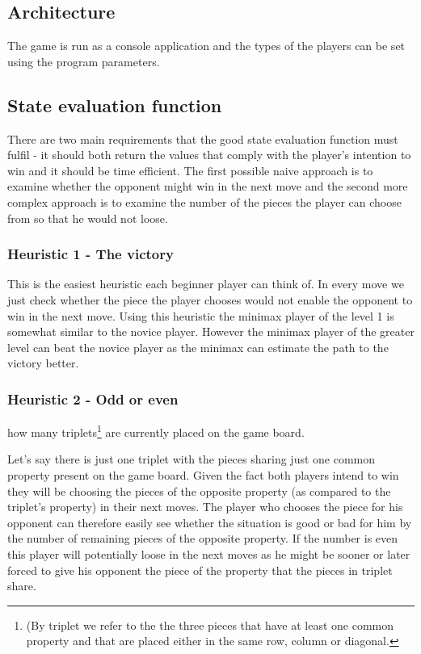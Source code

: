 \documentclass[paper=a4, fontsize=11pt]{article} %
\begin{document}
\subsection{Architecture} \label{txt:arch}

The game is run as a console application and the types of the players can be set using the program parameters.

\subsection{State evaluation function} \label{txt:evalfunc}

There are two main requirements that the good state evaluation function must fulfil - it should both return the values that comply with the player's intention to win and it should be time efficient. The first possible naive approach is to examine whether the opponent might win in the next move and the second more complex approach is to examine the number of the pieces the player can choose from so that he would not loose.

\subsubsection{Heuristic 1 - The victory}

This is the easiest heuristic each beginner player can think of. In every move we just check whether the piece the player chooses would not enable the opponent to win in the next move. Using this heuristic the minimax player of the level 1 is somewhat similar to the novice player. However the minimax player of the greater level can beat the novice player as the minimax can estimate the path to the victory better.

\subsubsection{Heuristic 2 - Odd or even}

how many triplets\footnote{(By triplet we refer to the the three pieces that have at least one common property and that are placed either in the same row, column or diagonal.} are currently placed on the game board.

Let's say there is just one triplet with the pieces sharing just one common property present on the game board. Given the fact both players intend to win they will be choosing the pieces of the opposite property (as compared to the triplet's property) in their next moves. The player who chooses the piece for his opponent can therefore easily see whether the situation is good or bad for him by the number of remaining pieces of the opposite property. If the number is even this player will potentially loose in the next moves as he might be sooner or later forced to give his opponent the piece of the property that the pieces in triplet share.
\end{document}
